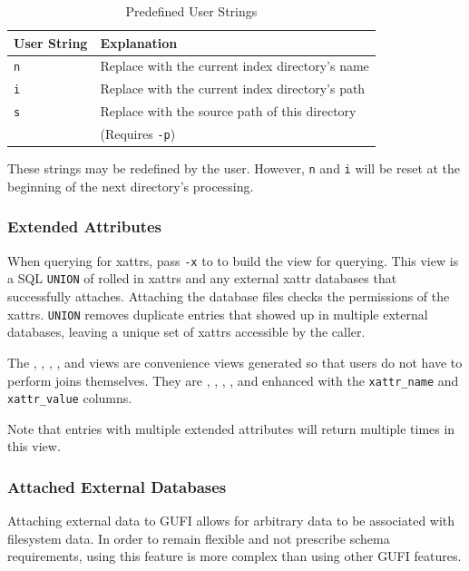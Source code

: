 \begin{table}[H]
  \centering
  \begin{tabular}{|l|l|}
    \hline
    User String & Explanation \\
    \hline
    \texttt{n} & Replace with the current index directory's name \\
    \hline
    \texttt{i} & Replace with the current index directory's path \\
    \hline
    \texttt{s} & Replace with the source path of this directory \\
               & (Requires \texttt{-p}) \\
    \hline
  \end{tabular}
  \caption{Predefined User Strings}
\end{table}

These strings may be redefined by the user. However, \texttt{n} and
\texttt{i} will be reset at the beginning of the next directory's
processing.

\subsubsection{Extended Attributes}
\label{sec:query_xattrs}
When querying for xattrs, pass \texttt{-x} to \gufiquery to build the
\xattrs view for querying. This view is a SQL \texttt{UNION} of rolled
in xattrs and any external xattr databases that successfully
attaches. Attaching the database files checks the permissions of the
xattrs. \texttt{UNION} removes duplicate entries that showed up in
multiple external databases, leaving a unique set of xattrs accessible
by the caller.

The \xentries, \xpentries, \xsummary, \vrxpentries, and \vrxsummary
views are convenience views generated so that users do not have to
perform joins themselves. They are \entries, \pentries, \summary,
\vrpentries, and \vrsummary enhanced with the \texttt{xattr\_name} and
\texttt{xattr\_value} columns.

Note that entries with multiple extended attributes will return
multiple times in this view.

\subsubsection{Attached External Databases}
Attaching external data to GUFI allows for arbitrary data to be
associated with filesystem data. In order to remain flexible and not
prescribe schema requirements, using this feature is more complex than
using other GUFI features.

